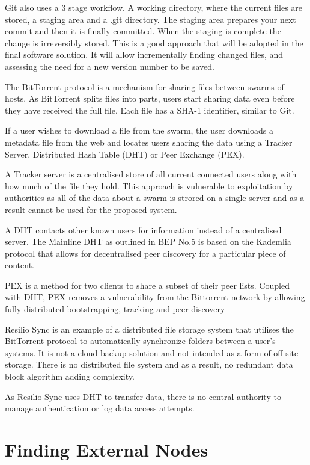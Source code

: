\documentclass[a4paper,10pt]{article}
\begin{document}
Git also uses a 3 stage workflow. A working directory, where the current files are stored, a staging area and a .git directory. The staging area prepares your next commit and then it is finally committed. When the staging is complete the change is irreversibly stored. This is a good approach that will be adopted in the final software solution. It will allow incrementally finding changed files, and assessing the need for a new version number to be saved.

The BitTorrent protocol is a mechanism for sharing files between swarms of hosts. As BitTorrent splits files into parts, users start sharing data even before they have received the full file. Each file has a SHA-1 identifier, similar to Git.

If a user wishes to download a file from the swarm, the user downloads a metadata file from the web and locates users sharing the data using a Tracker Server, Distributed Hash Table (DHT) or Peer Exchange (PEX).

A Tracker server is a centralised store of all current connected users along with how much of the file they hold. This approach is vulnerable to exploitation by authorities as all of the data about a swarm is strored on a single server and as a result cannot be used for the proposed system.

A DHT contacts other known users for information instead of a centralised server. The Mainline DHT as outlined in BEP No.5 is based on the Kademlia protocol that allows for decentralised peer discovery for a particular piece of content.

PEX is a method for two clients to share a subset of their peer lists. Coupled with DHT, PEX removes a vulnerability from the Bittorrent network by allowing fully distributed bootstrapping, tracking and peer discovery

Resilio Sync is an example of a distributed file storage system that utilises the BitTorrent protocol to automatically synchronize folders between a user’s systems. It is not a cloud backup solution and not intended as a form of off-site storage. There is no distributed file system and as a result, no redundant data block algorithm adding complexity.

As Resilio Sync uses DHT to transfer data, there is no central authority to manage authentication or log data access attempts.


\section{Finding External Nodes}
\end{document}
